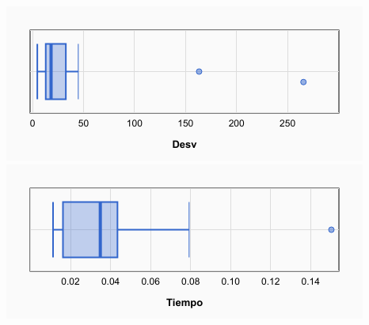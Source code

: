 \documentclass[a4paper, 12pt]{article}
\begin{document}
	\begin{center}
         \includegraphics[scale=0.5]{desv-esProp}
         \includegraphics[scale=0.5]{time-esProp}
      \end{center}
      
      
      
      \newpage
\end{document}
